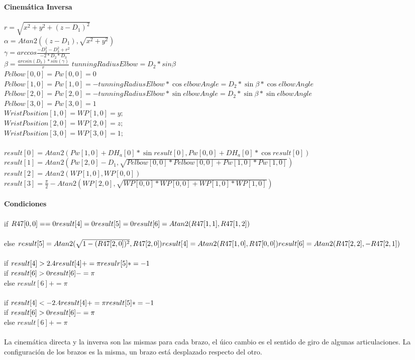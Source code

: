 \documentclass[user_manual.tex]{subfiles}
\begin{document}
\textbf{Cinemática Inversa}\\
\\
$r=\sqrt{x^2+y^2+(z-D_1)^2}$\\
$\alpha=Atan2((z-D_1),\sqrt{x^2+y^2})$\\
$\gamma=arccos\frac{-D_2^2-D_3^2+r^2}{-2*D_2*D_3}$\\
$\beta=\frac{arcsin(D_3)*sin(\gamma)}{r}$
$tunningRadiusElbow=D_2*sin\beta$\\
$Pelbow[0,0]=Pw[0,0]=0$\\
$Pelbow[1,0]=Pw[1,0]=-tunningRadiusElbow*\cos elbowAngle=D_2*\sin\beta*\cos elbowAngle$\\
$Pelbow[2,0]=Pw[2,0]=-tunningRadiusElbow*\sin elbowAngle=D_2 *\sin\beta*\sin elbowAngle$\\
$Pelbow[3,0]=Pw[3,0]=1$\\
$WristPosition[1,0]=WP[1,0]=y;$\\
$WristPosition[2,0]=WP[2,0]=z;$\\
$WristPosition[3,0]=WP[3,0]=1;$\\
\\
$result[0]=Atan2(Pw[1,0]+DH_a[0]*\sin result[0],Pw[0,0]+DH_a[0]*\cos result[0])$\\
$result[1]=Atan2(Pw[2,0]-D_1,\sqrt{Pelbow[0,0]*Pelbow[0,0]+Pw[1,0]*Pw[1,0]})$\\
$result[2]=Atan2(WP[1,0],WP[0,0])$\\
$result[3]=\frac{\pi}{2}-Atan2(WP[2,0],\sqrt{WP[0,0]*WP[0,0]+WP[1,0]*WP[1,0]})$\\
\\
\textbf{Condiciones}\\
\\
if $R47[0,0]==0\\
result[4]=0\\
result[5]=0\\
result[6]=Atan2(R47[1,1],R47[1,2])$\\
\\
else
$result[5]=Atan2(\sqrt{1-(R47[2,0])^2},R47[2,0])\\
result[4]=Atan2(R47[1,0],R47[0,0])\\
result[6]=Atan2(R47[2,2],-R47[2,1])$\\
\\
if $result[4]>2.4\\
result[4]+=\pi\\
resulr[5]*=-1$\\
if $result[6]>0\\
result[6]-=\pi$\\
else $result[6]+=\pi$\\
\\
if $result[4]<-2.4\\
result[4]+=\pi\\
result[5]*=-1$\\
if $result[6]>0\\
result[6]-=\pi$\\
else $result[6]+=\pi$\\
\\
La cinemática directa y la inversa son las mismas para cada brazo, el úico cambio es el sentido de giro de algunas articulaciones. La configuración de los brazos es la misma, un brazo está desplazado respecto del otro.
\end{document}
